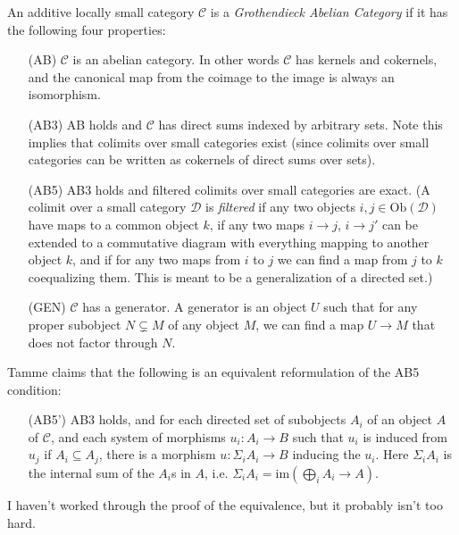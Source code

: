 \begin{defn} An additive locally small category $\mathcal{C}$ is a \emph{Grothendieck Abelian Category} if it has the following four properties:
\begin{itemize}
\item[(AB)] $\mathcal{C}$ is an abelian category. In other words $\mathcal{C}$ has kernels and cokernels, and the canonical map from the coimage to the image is always an isomorphism.

\item[(AB3)] AB holds and $\mathcal{C}$ has direct sums indexed by arbitrary sets. Note this implies that colimits over small categories exist (since colimits over small categories can be written as cokernels of direct sums over sets).

\item[(AB5)] AB3 holds and filtered colimits over small categories are exact. (A colimit over a small category $\mathcal{D}$ is \emph{filtered} if any two objects $i,j\in \mbox{Ob}(\mathcal{D})$ have maps to a common object $k$, if any two maps $i\rightarrow j$, $i\rightarrow j'$ can be extended to a commutative diagram with everything mapping to another object $k$, and if for any two maps from $i$ to $j$ we can find a map from $j$ to $k$ coequalizing them. This is meant to be a generalization of a directed set.)

\item[(GEN)] $\mathcal{C}$ has a generator. A generator is an object $U$ such that for any proper subobject $N \subsetneq M$ of any object $M$, we can find a map $U\rightarrow M$ that does not factor through $N$.
\end{itemize}
\end{defn}

\begin{rem} Tamme \cite{etale} claims that the following is an equivalent reformulation of the AB5 condition:
\begin{itemize}
\item[(AB5')] AB3 holds, and for each directed set of subobjects $A_i$ of an object $A$ of $\mathcal{C}$, and each system of morphisms $u_i:A_i\rightarrow B$ such that $u_i$ is induced from $u_j$ if $A_i \subseteq A_j$, there is a morphism $u:\Sigma_i A_i \rightarrow B$ inducing the $u_i$. Here $\Sigma_i A_i$ is the internal sum of the $A_i$s in $A$, i.e. $\Sigma_i A_i = \mbox{im}(\bigoplus_i A_i \rightarrow A)$.
\end{itemize}
I haven't worked through the proof of the equivalence, but it probably isn't too hard.
\end{rem}

